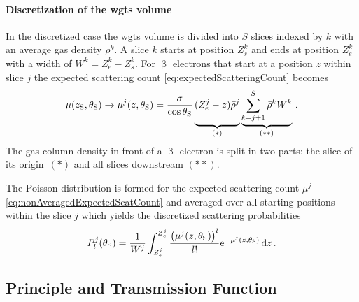 \paragraph{Discretization of the \gls{wgts} volume}
In the discretized case the \gls{wgts} volume is divided into $S$ slices indexed by $k$ with an average gas density $\bar{\rho}^k$. A slice $k$ starts at position $Z_s^k$ and ends at position $Z_e^k$ with a width of $W^k=Z_e^k-Z_s^k$. For $\upbeta$ electrons that start at a position $z$ within slice $j$ the expected scattering count \eqref{eq:expectedScatteringCount} becomes
\begin{equation}
\label{eq:nonAveragedExpectedScatCount}
    \mu(\zSource, \thetaSource) \rightarrow 
    \mu^j(z, \thetaSource) =
    \frac{\sigma}{\cos\thetaSource}
    \underbrace{
        (Z_e^j-z) \bar{\rho}^j
        \vphantom{\sum_{k=j+1}^{S}}
    }_{(*)}
    \underbrace{\sum_{k=j+1}^{S} \bar{\rho}^k W^k}_{(**)}
    \fullstop
\end{equation}
The gas column density in front of a $\upbeta$ electron is split in two parts: the slice of its \mbox{origin $(*)$} and all slices downstream \mbox{$(**)$}. 

The Poisson distribution is formed for the expected scattering count $\mu^j$ \eqref{eq:nonAveragedExpectedScatCount} and averaged over all starting positions within the slice $j$ which yields the discretized scattering probabilities
\begin{equation}
    \label{eq:nonAveragedScatProbs}
    P^j_l(\theta_\mathrm{S}) = 
    \frac{1}{W^j}
    \int_{Z_s^j}^{Z_e^j}
        \frac{
            \left(\mu^j(z,\theta_\mathrm{S})\right)^l
        }{l!}
        \mathrm{e}^{-\mu^j(z,\theta_\mathrm{S})}
    \mathop{}\!\mathrm{d} z
    \text{\,.}
\end{equation}


\subsection{ Principle and Transmission Function}
\label{sec:mace}
\begin{figure}[t]
	    \label{fig:mace}
    \end{figure}

